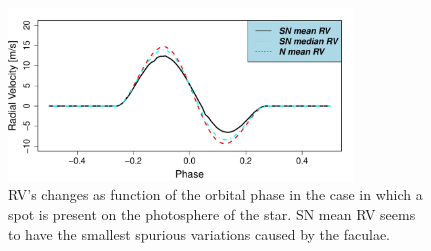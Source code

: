 \documentclass{aa}
\begin{document}
\begin{figure}[htbp]
\begin{center}
\includegraphics[width=3.6in]{RV_comparison_SPOT.pdf} 
\caption{RV's changes as function of the orbital phase in the case in which a spot is present on the photosphere of the star. SN mean RV seems to have the smallest spurious variations caused by the faculae.}
    \label{fig:spot}
\end{center}
\end{figure}
\end{document}
